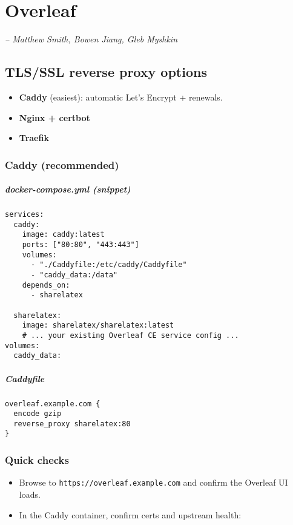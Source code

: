 \chapter{Overleaf}
\small\textit{-- Matthew Smith, Bowen Jiang, Gleb Myshkin}

\section*{TLS/SSL reverse proxy options}
\begin{itemize}[leftmargin=*]
  \item \textbf{Caddy} (easiest): automatic Let's Encrypt + renewals.
  \item \textbf{Nginx + certbot}
  \item \textbf{Traefik}
\end{itemize}

\subsection*{Caddy (recommended)}
\paragraph{docker-compose.yml (snippet)}
\begin{verbatim}
services:
  caddy:
    image: caddy:latest
    ports: ["80:80", "443:443"]
    volumes:
      - "./Caddyfile:/etc/caddy/Caddyfile"
      - "caddy_data:/data"
    depends_on:
      - sharelatex

  sharelatex:
    image: sharelatex/sharelatex:latest
    # ... your existing Overleaf CE service config ...
volumes:
  caddy_data:
\end{verbatim}

\paragraph{Caddyfile}
\begin{verbatim}
overleaf.example.com {
  encode gzip
  reverse_proxy sharelatex:80
}
\end{verbatim}

\subsection*{Quick checks}
\begin{itemize}[leftmargin=*]
  \item Browse to \texttt{https://overleaf.example.com} and confirm the Overleaf UI loads.
  \item In the Caddy container, confirm certs and upstream health:
\end{itemize}

